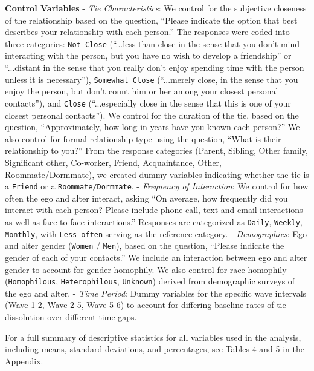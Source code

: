 \textbf{Control Variables} - \emph{Tie Characteristics}: We control for
the subjective closeness of the relationship based on the question, ``Please indicate the option that best describes your relationship with each person.'' The responses were coded into three categories: \texttt{Not\ Close} (``...less than close in the sense that you don't mind interacting with the person, but you have no wish to develop a friendship'' or ``...distant in the sense that you really don’t enjoy spending time with the person unless it is necessary''),
\texttt{Somewhat\ Close} (``...merely close, in the sense that you enjoy the person, but don’t count him or her among your closest personal contacts''), and \texttt{Close} (``...especially close in the sense that this is one of your closest personal contacts''). We control for the duration of the tie, based on the question, ``Approximately, how long in years have you known each person?'' We also control for formal relationship type using the question, ``What is their relationship to you?'' From the response categories (Parent, Sibling, Other family, Significant other, Co-worker, Friend, Acquaintance, Other, Roommate/Dormmate), we created dummy variables indicating whether the tie is a \texttt{Friend} or a \texttt{Roommate/Dormmate}.
- \emph{Frequency of Interaction}: We control for how often the ego and alter interact, asking ``On average, how frequently did you interact with each person? Please include phone call, text and email interactions as well as face-to-face interactions.'' Responses are categorized as \texttt{Daily}, \texttt{Weekly}, \texttt{Monthly}, with \texttt{Less often} serving as the reference category.
- \emph{Demographics}: Ego and alter gender (\texttt{Women} /
\texttt{Men}), based on the question, ``Please indicate the gender of each of your contacts.'' We include an interaction between ego and alter gender to account for gender homophily. We also control for race homophily (\texttt{Homophilous}, \texttt{Heterophilous}, \texttt{Unknown}) derived from demographic surveys of the ego and alter. - \emph{Time Period}: Dummy variables
for the specific wave intervals (Wave 1-2, Wave 2-5, Wave 5-6) to
account for differing baseline rates of tie dissolution over different
time gaps.

For a full summary of descriptive statistics for all variables used in the analysis, including means, standard deviations, and percentages, see Tables 4 and 5 in the Appendix.
